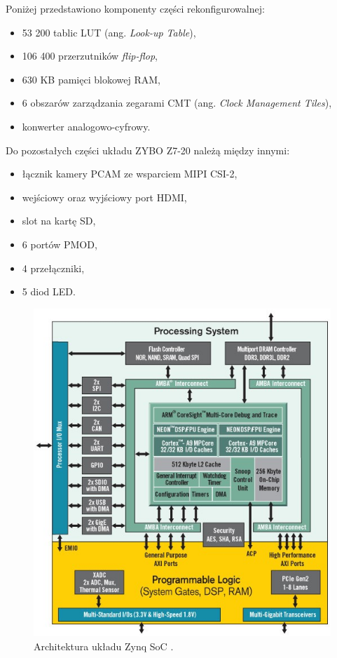 Poniżej przedstawiono komponenty części rekonfigurowalnej:
\begin{itemize}
	\item 53 200 tablic LUT (ang. \textit{Look-up Table}),
	\item 106 400 przerzutników \textit{flip-flop},
	\item 630 KB pamięci blokowej RAM,
	\item 6 obszarów zarządzania zegarami CMT (ang. \textit{Clock Management Tiles}),
	\item konwerter analogowo-cyfrowy.
\end{itemize}
Do pozostałych części układu ZYBO Z7-20 należą między innymi:
\begin{itemize}
	\item łącznik kamery PCAM ze wsparciem MIPI CSI-2,
	\item wejściowy oraz wyjściowy port HDMI,
	\item slot na kartę SD,
	\item 6 portów PMOD,
	\item 4 przełączniki,
	\item 5 diod LED.
\end{itemize}

\begin{figure}[h]
	\centering
	\includegraphics[width=\textwidth]{zynq.png}
	\caption{Architektura układu Zynq SoC \cite{zynq}.}
	\label{fig:zynq}
\end{figure}


